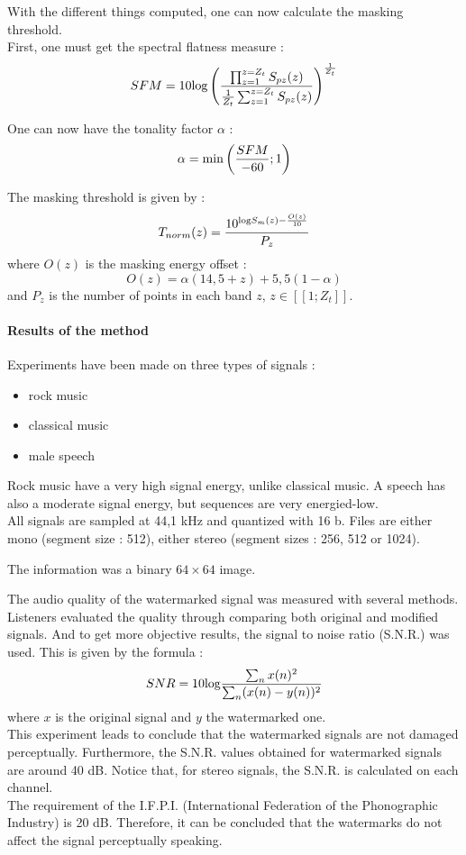 With the different things computed, one can now calculate the masking threshold.\\
First, one must get the spectral flatness measure :
$$SFM = 10\textnormal{log}\left(\frac{\prod_{z = 1}^{z = Z_t} S_{pz}(z)}{\frac{1}{Z_t}\sum_{z = 1}^{z = Z_t} S_{pz}(z)}\right)^\frac{1}{Z_t}$$

One can now have the tonality factor $\alpha$ :
$$\alpha = \textnormal{min}\left(\frac{SFM}{-60} ; 1\right)$$

The masking threshold is given by :
$$T_{norm}(z) = \frac{10^{\textnormal{log} S_m(z)-\frac{O(z)}{10}}}{P_z}$$
where $O(z)$ is the masking energy offset :
$$O(z) = \alpha(14,5 + z) + 5,5(1 - \alpha)$$
and $P_z$ is the number of points in each band $z$, $z \in [\![1 ; Z_t]\!]$.

\paragraph{Results of the method}
Experiments have been made on three types of signals :
\begin{itemize}
\item rock music
\item classical music
\item male speech
\end{itemize}
Rock music have a very high signal energy, unlike classical music. A speech has also a moderate signal energy, but sequences are very energied-low.\\
All signals are sampled at 44,1 kHz and quantized with 16 b. Files are either mono (segment size : 512), either stereo (segment sizes : 256, 512 or 1024).

The information was a binary $64\times64$ image.

The audio quality of the watermarked signal was measured with several methods. Listeners evaluated the quality through comparing both original and modified signals. And to get more objective results, the signal to noise ratio (S.N.R.) was used. This is given by the formula :
$$SNR = 10\textnormal{log}\frac{\sum_{n} x(n)^2}{\sum_{n} (x(n) - y(n))^2}$$
where $x$ is the original signal and $y$ the watermarked one.\\
This experiment leads to conclude that the watermarked signals are not damaged perceptually. Furthermore, the S.N.R. values obtained for watermarked signals are around 40 dB. Notice that, for stereo signals, the S.N.R. is calculated on each channel.\\
The requirement of the I.F.P.I. (International Federation of the Phonographic Industry) is 20 dB. Therefore, it can be concluded that the watermarks do not affect the signal perceptually speaking.

